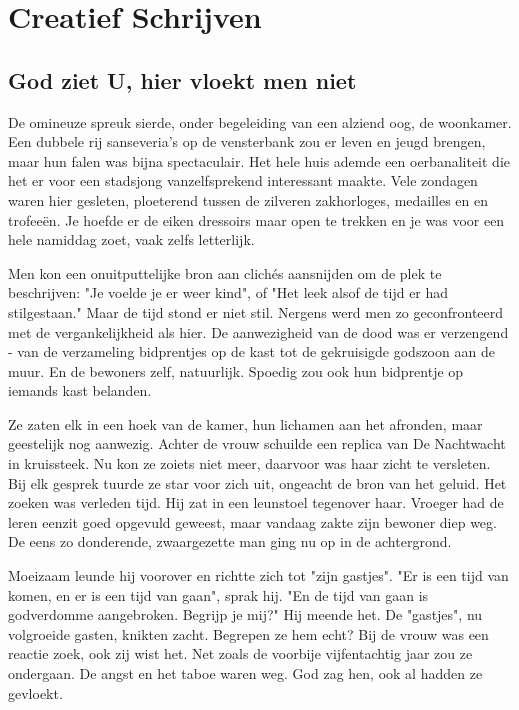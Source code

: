 \documentclass[12pt, justified, a4paper, symmetric]{tufte-book}
\begin{document}
\chapter{Creatief Schrijven}
\section{God ziet U, hier vloekt men niet}
De omineuze spreuk sierde, onder begeleiding van een alziend oog, de woonkamer. Een dubbele rij sanseveria's op de vensterbank zou er leven en jeugd brengen, maar hun falen was bijna spectaculair. Het hele huis ademde een oerbanaliteit die het er voor een stadsjong vanzelfsprekend interessant maakte. Vele zondagen waren hier gesleten, ploeterend tussen de zilveren zakhorloges, medailles en en trofee\"en. Je hoefde er de eiken dressoirs maar open te trekken en je was voor een hele namiddag zoet, vaak zelfs letterlijk.

Men kon een onuitputtelijke bron aan clich\'es aansnijden om de plek te beschrijven: "Je voelde je er weer kind", of "Het leek alsof de tijd er had stilgestaan." Maar de tijd stond er niet stil. Nergens werd men zo geconfronteerd met de vergankelijkheid als hier. De aanwezigheid van de dood was er verzengend - van de verzameling bidprentjes op de kast tot de gekruisigde godszoon aan de muur. En de bewoners zelf, natuurlijk. Spoedig zou ook hun bidprentje op iemands kast belanden.

Ze zaten elk in een hoek van de kamer, hun lichamen aan het afronden, maar geestelijk nog aanwezig. Achter de vrouw schuilde een replica van De Nachtwacht in kruissteek. Nu kon ze zoiets niet meer, daarvoor was haar zicht te versleten. Bij elk gesprek tuurde ze star voor zich uit, ongeacht de bron van het geluid. Het zoeken was verleden tijd. Hij zat in een leunstoel tegenover haar. Vroeger had de leren eenzit goed opgevuld geweest, maar vandaag zakte zijn bewoner diep weg. De eens zo donderende, zwaargezette man ging nu op in de achtergrond.

Moeizaam leunde hij voorover en richtte zich tot "zijn gastjes". "Er is een tijd van komen, en er is een tijd van gaan", sprak hij. "En de tijd van gaan is godverdomme aangebroken. Begrijp je mij?" Hij meende het. De "gastjes", nu volgroeide gasten, knikten zacht. Begrepen ze hem echt? Bij de vrouw was een reactie zoek, ook zij wist het. Net zoals de voorbije vijfentachtig jaar zou ze ondergaan. De angst en het taboe waren weg. God zag hen, ook al hadden ze gevloekt.
\end{document}
